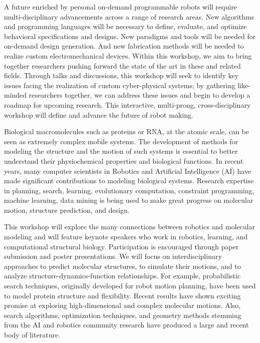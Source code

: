 \begin{spacing}{1.0}
{
A future enriched by personal on-demand programmable robots will require multi-disciplinary advancements across a range of research areas. New algorithms and programming languages will be necessary to define, evaluate, and optimize behavioral specifications and designs. New paradigms and tools will be needed for on-demand design generation. And new fabrication methods will be needed to realize custom electromechanical devices. Within this workshop, we aim to bring together researchers pushing forward the state of the art in these and related fields. Through talks and discussions, this workshop will seek to identify key issues facing the realization of custom cyber-physical systems; by gathering like-minded researchers together, we can address these issues and begin to develop a roadmap for upcoming research. This interactive, multi-prong, cross-disciplinary workshop will define and advance the future of robot making.
}



{
Biological macromolecules such as proteins or RNA, at the atomic scale, can be seen as extremely complex mobile systems. The development of methods for modeling the structure and the motion of such systems is essential to better understand their physiochemical properties and biological functions. In recent years, many computer scientists in Robotics and Artificial Intelligence (AI) have made significant contributions to modeling biological systems. Research expertise in planning, search, learning, evolutionary computation, constraint programming, machine learning, data mining is being used to make great progress on molecular motion, structure prediction, and design. 

This workshop will explore the many connections between robotics and molecular modeling and will feature keynote speakers who work in robotics, learning, and computational structural biology. Participation is encouraged through paper submission and poster presentations. We will focus on interdisciplinary approaches to predict molecular structures, to simulate their motions, and to analyze structure-dynamics-function relationships. For example, probabilistic search techniques, originally developed for robot motion planning, have been used to model protein structure and flexibility. Recent results have shown exciting promise at exploring high-dimensional and complex molecular motions. Also, search algorithms, optimization techniques, and geometry methods stemming from the AI and robotics community research have produced a large and recent body of literature. 

}
\end{spacing}
